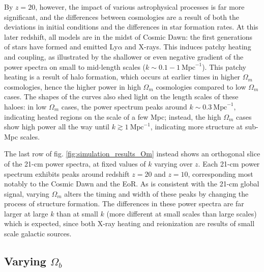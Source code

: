 \documentclass[floats,floatfix,showpacs,amssymb,prd,superscriptaddress,nofootinbib]{revtex4-2} %
\begin{document}
By $z = 20$, however, the impact of various astrophysical processes is far more significant, and the differences between cosmologies are a result of both the deviations in initial conditions and the differences in star formation rates. At this later redshift, all models are in the midst of Cosmic Dawn: the first generations of stars have formed and emitted Ly$\alpha$ and X-rays. This induces patchy heating and coupling, as illustrated by the shallower or even negative gradient of the power spectra on small to mid-length scales ($k \sim 0.1 - 1 ~\text{Mpc}^{-1}$). This patchy heating is a result of halo formation, which occurs at earlier times in higher $\Omega_m$ cosmologies, hence the higher power in high $\Omega_m$ cosmologies compared to low $\Omega_m$ cases. The shapes of the curves also shed light on the length scales of these haloes: in low $\Omega_m$ cases, the power spectrum peaks around $k \sim 0.3 ~\text{Mpc}^{-1}$, indicating heated regions on the scale of a few Mpc; instead, the high $\Omega_m$ cases show high power all the way until $k \gtrsim 1 ~\text{Mpc}^{-1}$, indicating more structure at sub-Mpc scales. 



The last row of fig. \ref{fig:simulation_results_Om} instead shows an orthogonal slice of the 21-cm power spectra, at fixed values of $k$ varying over $z$. Each 21-cm power spectrum exhibits peaks around redshift $z = 20$ and $z = 10$, corresponding most notably to the Cosmic Dawn and the EoR. As is consistent with the 21-cm global signal, varying $\Omega_m$ alters the timing and width of these peaks by changing the process of structure formation. The differences in these power spectra are far larger at large $k$ than at small $k$ (more different at small scales than large scales) which is expected, since both X-ray heating and reionization are results of small scale galactic sources. 


\subsection{Varying $\Omega_b$}
\end{document}
